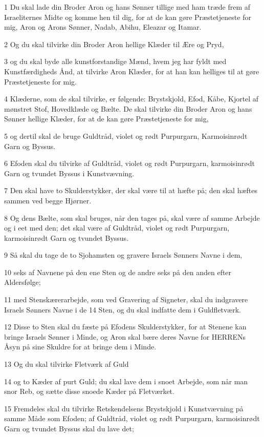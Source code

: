 \par 1 Du skal lade din Broder Aron og hans Sønner tillige med ham træde frem af Israeliternes Midte og komme hen til dig, for at de kan gøre Præstetjeneste for mig, Aron og Arons Sønner, Nadab, Abihu, Eleazar og Itamar.
\par 2 Og du skal tilvirke din Broder Aron hellige Klæder til Ære og Pryd,
\par 3 og du skal byde alle kunstforstandige Mænd, hvem jeg har fyldt med Kunstfærdigheds Ånd, at tilvirke Aron Klæder, for at han kan helliges til at gøre Præstetjeneste for mig.
\par 4 Klæderne, som de skal tilvirke, er følgende: Brystskjold, Efod, Kåbe, Kjortel af mønstret Stof, Hovedklæde og Bælte. De skal tilvirke din Broder Aron og hans Sønner hellige Klæder, for at de kan gøre Præstetjeneste for mig,
\par 5 og dertil skal de bruge Guldtråd, violet og rødt Purpurgarn, Karmoisinrødt Garn og Byssus.
\par 6 Efoden skal du tilvirke af Guldtråd, violet og rødt Purpurgarn, karmoisinrødt Garn og tvundet Byssus i Kunstvævning.
\par 7 Den skal have to Skulderstykker, der skal være til at hæfte på; den skal hæftes sammen ved begge Hjørner.
\par 8 Og dens Bælte, som skal bruges, når den tages på, skal være af samme Arbejde og i eet med den; det skal være af Guldtråd, violet og rødt Purpurgarn, karmoisinrødt Garn og tvundet Byssus.
\par 9 Så skal du tage de to Sjohamsten og gravere Israels Sønners Navne i dem,
\par 10 seks af Navnene på den ene Sten og de andre seks på den anden efter Aldersfølge;
\par 11 med Stenskærerarbejde, som ved Gravering af Signeter, skal du indgravere Israels Sønners Navne i de 14 Sten, og du skal indfatte dem i Guldfletværk.
\par 12 Disse to Sten skal du fæste på Efodens Skulderstykker, for at Stenene kan bringe Israels Sønner i Minde, og Aron skal bære deres Navne for HERRENs Åsyn på sine Skuldre for at bringe dem i Minde.
\par 13 Og du skal tilvirke Fletværk af Guld
\par 14 og to Kæder af purt Guld; du skal lave dem i snoet Arbejde, som når man snor Reb, og sætte disse snoede Kæder på Fletværket.
\par 15 Fremdeles skal du tilvirke Retskendelsens Brystskjold i Kunstvævning på samme Måde som Efoden; af Guldtråd, violet og rødt Purpurgarn, karmoisinrødt Garn og tvundet Byssus skal du lave det;
